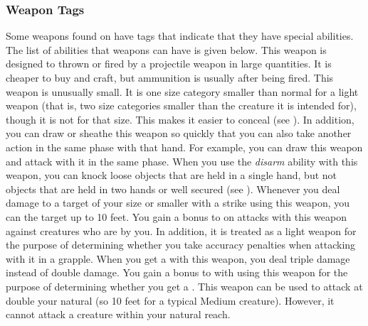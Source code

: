         \subsubsection{Weapon Tags}\label{Weapon Tags}
            Some weapons found on  have tags that indicate that they have special abilities. The list of abilities that weapons can have is given below.
             This weapon is designed to thrown or fired by a projectile weapon in large quantities. It is cheaper to buy and craft, but ammunition is usually  after being fired.
             This weapon is unusually small.
            It is one size category smaller than normal for a light weapon (that is, two size categories smaller than the creature it is intended for), though it is not  for that size.
            This makes it easier to conceal (see ).
            In addition, you can draw or sheathe this weapon so quickly that you can also take another action in the same phase with that hand.
            For example, you can draw this weapon and attack with it in the same phase.
             When you use the \textit{disarm} ability with this weapon, you can knock loose objects that are held in a single hand, but not objects that are held in two hands or well secured (see ).
             Whenever you deal damage to a target of your size or smaller with a strike using this weapon, you can  the target up to 10 feet.
             You gain a  bonus to  on  attacks with this weapon against creatures who are \grappled by you.
            In addition, it is treated as a light weapon for the purpose of determining whether you take accuracy penalties when attacking with it in a grapple.
             When you get a  with this weapon, you deal triple damage instead of double damage.
             You gain a  bonus to  with  using this weapon for the purpose of determining whether you get a .
            \label{Long Weapon} This weapon can be used to attack at double your natural  (so 10 feet for a typical Medium creature).
            However, it cannot attack a creature within your natural reach.

